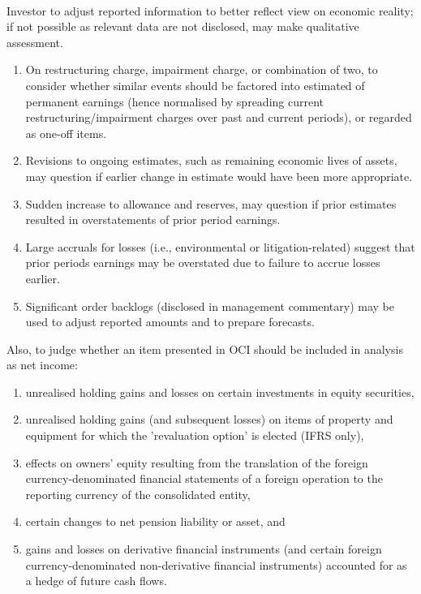 \begin{remark} \\
Investor to adjust reported information to better reflect view on economic reality; if not possible as relevant data are not disclosed, may make qualitative assessment.
\begin{enumerate}[label=\roman*.]
\setlength{\itemsep}{0pt}
\item On restructuring charge, impairment charge, or combination of two, to consider whether similar events should be factored into estimated of permanent earnings (hence normalised by spreading current restructuring/impairment charges over past and current periods), or regarded as one-off items.
\item Revisions to ongoing estimates, such as remaining economic lives of assets, may question if earlier change in estimate would have been more appropriate.
\item Sudden increase to allowance and reserves, may question if prior estimates resulted in overstatements of prior period earnings.
\item Large accruals for losses (i.e., environmental or litigation-related) suggest that prior periods earnings may be overstated due to failure to accrue losses earlier.
\item Significant order backlogs (disclosed in management commentary) may be used to adjust reported amounts and to prepare forecasts.
\end{enumerate}
Also, to judge whether an item presented in OCI should be included in analysis as net income:
\begin{enumerate}[label=\roman*.]
\setlength{\itemsep}{0pt}
\item unrealised holding gains and losses on certain investments in equity securities,
\item unrealised holding gains (and subsequent losses) on items of property and equipment for which the 'revaluation option' is elected (IFRS only),
\item effects on owners’ equity resulting from the translation of the foreign currency-denominated financial statements of a foreign operation to the reporting currency of the consolidated entity,
\item certain changes to net pension liability or asset, and
\item gains and losses on derivative financial instruments (and certain foreign currency-denominated non-derivative financial instruments) accounted for as a hedge of future cash flows.
\end{enumerate}
\end{remark}

